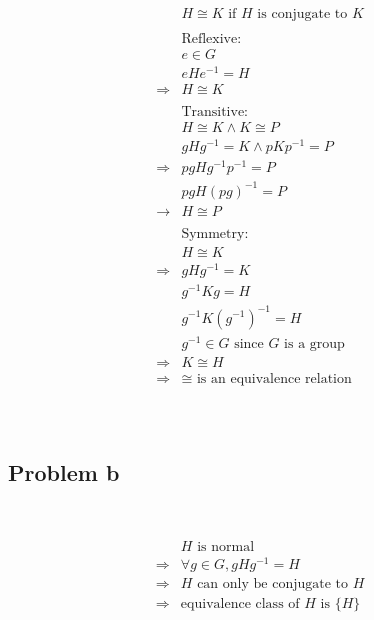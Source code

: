 \documentclass{article}
\begin{document}
~

\begin{equation*}
    \begin{split}
        &H\cong K\text{ if }H\text{ is conjugate to }K\\
        &\\
        &\text{Reflexive}:\\
        &e\in G\\
        &eHe^{-1}=H\\
        \Rightarrow&H\cong K\\
        &\\
        &\text{Transitive}:\\
        &H\cong K\land K\cong P\\
        &gHg^{-1}=K\land pKp^{-1}=P\\
        \Rightarrow&pgHg^{-1}p^{-1}=P\\
        &pgH(pg)^{-1}=P\\
        \rightarrow&H\cong P\\
        &\\
        &\text{Symmetry}:\\
        &H\cong K\\
        \Rightarrow&gHg^{-1}=K\\
        &g^{-1}Kg=H\\
        &g^{-1}K(g^{-1})^{-1}=H\\
        &g^{-1}\in G\text{ since }G\text{ is a group}\\
        \Rightarrow&K\cong H\\
        \Rightarrow&\cong\text{ is an equivalence relation}\\
    \end{split}
\end{equation*}

~

\subsection*{Problem b}

~

\begin{equation*}
    \begin{split}
        &H\text{ is normal}\\
        \Rightarrow&\forall g\in G,gHg^{-1}=H\\
        \Rightarrow&H\text{ can only be conjugate to }H\\
        \Rightarrow&\text{equivalence class of }H\text{ is }\{H\}\\
    \end{split}
\end{equation*}
\end{document}
